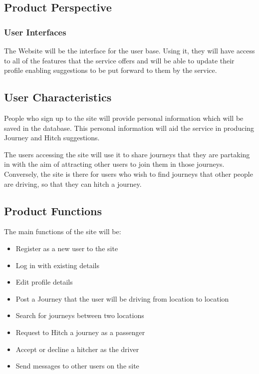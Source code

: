 \documentclass[11pt]{article}
\begin{document}
\subsection{Product Perspective}
\subsubsection{User Interfaces}
The Website will be the interface for the user base. Using it, they will have access to all of the features that the service offers and will be able to update their profile enabling suggestions to be put forward to them by the service.

\subsection{User Characteristics}
People who sign up to the site will provide personal information which will be saved in the database. This personal information will aid the service in producing Journey and Hitch suggestions. 

The users accessing the site will use it to share journeys that they are partaking in with the aim of attracting other users to join them in those journeys. Conversely, the site is there for users who wish to find journeys that other people are driving, so that they can hitch a journey.

\subsection{Product Functions}
The main functions of the site will be:
\begin{itemize}
\item Register as a new user to the site
\item Log in with existing details
\item Edit profile details
\item Post a Journey that the user will be driving from location to location
\item Search for journeys between two locations
\item Request to Hitch a journey as a passenger
\item Accept or decline a hitcher as the driver
\item Send messages to other users on the site
\end{itemize}
\end{document}
